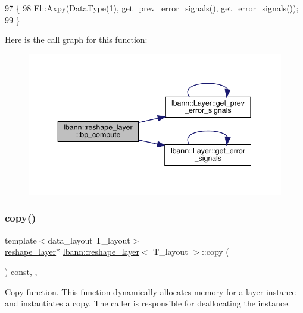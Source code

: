 \begin{DoxyCode}
97                              \{
98     El::Axpy(DataType(1), \hyperlink{classlbann_1_1Layer_a7ac4579d3c1671dfaf86e3b618d6938a}{get\_prev\_error\_signals}(), 
      \hyperlink{classlbann_1_1Layer_adb561e140e0bb601f3c5a8ee053a71d2}{get\_error\_signals}());
99   \}
\end{DoxyCode}
Here is the call graph for this function\+:\nopagebreak
\begin{figure}[H]
\begin{center}
\leavevmode
\includegraphics[width=343pt]{classlbann_1_1reshape__layer_a31d90673a9d98ccba0eafb4bf76cbe20_cgraph}
\end{center}
\end{figure}
\mbox{\label{classlbann_1_1reshape__layer_a41685576d72830e400c31536d1d5bab2}} 
\subsubsection{\texorpdfstring{copy()}{copy()}}
{\footnotesize\ttfamily template$<$data\+\_\+layout T\+\_\+layout$>$ \\
\hyperlink{classlbann_1_1reshape__layer}{reshape\+\_\+layer}$\ast$ \hyperlink{classlbann_1_1reshape__layer}{lbann\+::reshape\+\_\+layer}$<$ T\+\_\+layout $>$\+::copy (\begin{DoxyParamCaption}{ }\end{DoxyParamCaption}) const\hspace{0.3cm}{\ttfamily [inline]}, {\ttfamily [override]}, {\ttfamily [virtual]}}

Copy function. This function dynamically allocates memory for a layer instance and instantiates a copy. The caller is responsible for deallocating the instance. 

